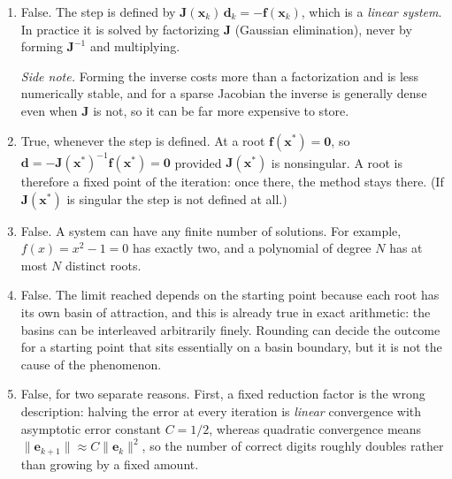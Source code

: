 \begin{solution}
    
    \begin{enumerate}[label=(\alph*)]
        \item False. The step is defined by $\mathbf{J}(\mathbf{x}_k)\,\mathbf{d}_k = -\mathbf{f}(\mathbf{x}_k)$, which is a \emph{linear system}. In practice it is solved by factorizing $\mathbf{J}$ (Gaussian elimination), never by forming $\mathbf{J}^{-1}$ and multiplying.

        \emph{Side note.} Forming the inverse costs more than a factorization and is less numerically stable, and for a sparse Jacobian the inverse is generally dense even when $\mathbf{J}$ is not, so it can be far more expensive to store.
        \item True, whenever the step is defined. At a root $\mathbf{f}(\mathbf{x}^*) = \mathbf{0}$, so $\mathbf{d} = -\mathbf{J}(\mathbf{x}^*)^{-1}\mathbf{f}(\mathbf{x}^*) = \mathbf{0}$ provided $\mathbf{J}(\mathbf{x}^*)$ is nonsingular. A root is therefore a fixed point of the iteration: once there, the method stays there. (If $\mathbf{J}(\mathbf{x}^*)$ is singular the step is not defined at all.)
        \item False. A system can have any finite number of solutions. For example, $f(x) = x^2 - 1 = 0$ has exactly two, and a polynomial of degree $N$ has at most $N$ distinct roots.
        \item False. The limit reached depends on the starting point because each root has its own basin of attraction, and this is already true in exact arithmetic: the basins can be interleaved arbitrarily finely. Rounding can decide the outcome for a starting point that sits essentially on a basin boundary, but it is not the cause of the phenomenon.
        \item False, for two separate reasons. First, a fixed reduction factor is the wrong description: halving the error at every iteration is \emph{linear} convergence with asymptotic error constant $C = 1/2$, whereas quadratic convergence means $\|\mathbf{e}_{k+1}\| \approx C\|\mathbf{e}_k\|^2$, so the number of correct digits roughly doubles rather than growing by a fixed amount.


\end{enumerate}
\end{solution}
